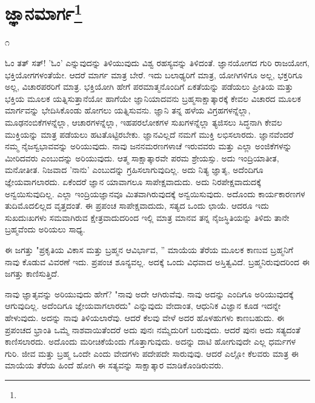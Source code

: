 
\chapter[ಜ್ಞಾನಮಾರ್ಗ]{ಜ್ಞಾನಮಾರ್ಗ\protect\footnote{}}

\begin{center}
೧
\end{center}

ಓಂ ತತ್ ಸತ್! 'ಓಂ' ಎನ್ನುವುದನ್ನು ತಿಳಿಯುವುದು ವಿಶ್ವ ರಹಸ್ಯವನ್ನು ತಿಳಿದಂತೆ. ಜ್ಞಾನಯೋಗದ ಗುರಿ ರಾಜಯೋಗ, ಭಕ್ತಿಯೋಗಗಳಂತೆಯೇ. ಆದರೆ ಮಾರ್ಗ ಮಾತ್ರ ಬೇರೆ. ಇದು ಬಲಾಢ್ಯರಿಗೆ ಮಾತ್ರ, ಯೋಗಿಗಳಿಗೂ ಅಲ್ಲ, ಭಕ್ತರಿಗೂ ಅಲ್ಲ, ವಿಚಾರಪರರಿಗೆ ಮಾತ್ರ. ಭಕ್ತಿಯೋಗಿ ಹೇಗೆ ಪರಮಾತ್ಮನೊಂದಿಗೆ ಏಕತೆಯನ್ನು ಪಡೆಯಲು ಪ್ರೀತಿಯ ಮತ್ತು ಭಕ್ತಿಯ ಮೂಲಕ ಯತ್ನಿಸುತ್ತಾನೆಯೋ ಹಾಗೆಯೇ ಜ್ಞಾನಿಯಾದವನು ಬ್ರಹ್ಮಸಾಕ್ಷಾತ್ಕಾರಕ್ಕೆ ಕೇವಲ ವಿಚಾರದ ಮೂಲಕ ಮಾರ್ಗವನ್ನು ಭೇದಿಸಿಕೊಂಡು ಹೋಗಲು ಯತ್ನಿಸುವನು. ಜ್ಞಾನಿ ತನ್ನ ಹಳೆಯ ವಿಗ್ರಹಗಳನ್ನೆಲ್ಲಾ, ಮೂಢನಂಬಿಕೆಗಳನ್ನೆಲ್ಲಾ, ಆಚಾರಗಳನ್ನೆಲ್ಲಾ, ಇಹಪರಲೋಕಗಳ ಸುಖಗಳನ್ನೆಲ್ಲಾ ತ್ಯಜಿಸಲು ಸಿದ್ಧನಾಗಿ ಕೇವಲ ಮುಕ್ತಿಯನ್ನು ಮಾತ್ರ ಪಡೆಯಲು ಹಟತೊಟ್ಟಿರಬೇಕು. ಜ್ಞಾನವಿಲ್ಲದೆ ನಮಗೆ ಮುಕ್ತಿ ಲಭಿಸಲಾರದು. ಜ್ಞಾನವೆಂದರೆ ನಮ್ಮ ನೈಜಸ್ವಭಾವವನ್ನು ಅರಿಯುವುದು. ನಾವು ಜನನಮರಣಗಳಾಚೆ ಇರುವವರು ಮತ್ತು ಎಲ್ಲಾ ಅಂಜಿಕೆಗಳನ್ನು ಮೀರಿದವರು ಎಂಬುದನ್ನು ಅರಿಯುವುದು. ಆತ್ಮ ಸಾಕ್ಷಾತ್ಕಾರವೇ ಪರಮ ಶ್ರೇಯಸ್ಸು. ಅದು ಇಂದ್ರಿಯಾತೀತ, ಮನೋತೀತ. ನಿಜವಾದ 'ನಾನು' ಎಂಬುದನ್ನು ಗ್ರಹಿಸಲಾಗುವುದಿಲ್ಲ. ಅದು ನಿತ್ಯ ಜ್ಞಾತೃ, ಅದೆಂದಿಗೂ ಜ್ಞೇಯವಾಗಲಾರದು. ಏಕೆಂದರೆ ಜ್ಞಾನ ಯಾವಾಗಲೂ ಸಾಪೇಕ್ಷವಾದುದು. ಅದು ನಿರಪೇಕ್ಷವಾದುದಕ್ಕೆ ಅನ್ವಯಿಸುವುದಿಲ್ಲ. ಎಲ್ಲಾ ಇಂದ್ರಿಯಜ್ಞಾನವೂ ಮಿತವಾಗಿರುವುದಕ್ಕೆ ಅನ್ವಯಿಸುವುದು. ಅದೊಂದು ಕಾರ್ಯಕಾರಣಗಳ ತುದಿಮೊದಲಿಲ್ಲದ ವೃತ್ತದಂತೆ. ಈ ಪ್ರಪಂಚ ಸಾಪೇಕ್ಷವಾದುದು, ಸತ್ಯದ ಒಂದು ಛಾಯೆ. ಆದರೂ ಇದು ಸುಖದುಃಖಗಳು ಸಮವಾಗಿರುವ ಕ್ಷೇತ್ರವಾದುದರಿಂದ ಇಲ್ಲಿ ಮಾತ್ರ ಮಾನವ ತನ್ನ ನೈಜಸ್ಥಿತಿಯನ್ನು ತಿಳಿದು ತಾನೇ ಬ್ರಹ್ಮವೆಂದು ಅರಿಯಲು ಸಾಧ್ಯ.

ಈ ಜಗತ್ತು "ಪ್ರಕೃತಿಯ ವಿಕಾಸ ಮತ್ತು ಬ್ರಹ್ಮನ ಆವಿರ್ಭಾವ, '' ಮಾಯೆಯ ತೆರೆಯ ಮೂಲಕ ಕಾಣುವ ಬ್ರಹ್ಮನಿಗೆ ನಾವು ಕೊಡುವ ವಿವರಣೆ ಇದು. ಪ್ರಪಂಚ ಶೂನ್ಯವಲ್ಲ. ಅದಕ್ಕೆ ಒಂದು ವಿಧವಾದ ಅಸ್ತಿತ್ವವಿದೆ. ಬ್ರಹ್ಮನಿರುವುದರಿಂದ ಈ ಜಗತ್ತು ಕಾಣಿಸುತ್ತಿದೆ.

ನಾವು ಜ್ಞಾತೃವನ್ನು ಅರಿಯುವುದು ಹೇಗೆ? "ನಾವು ಅದೇ ಆಗಿರುವೆವು. ನಾವು ಅದನ್ನು ಎಂದಿಗೂ ಅರಿಯುವುದಕ್ಕೆ ಆಗುವುದಿಲ್ಲ. ಅದೆಂದಿಗೂ ಜ್ಞೇಯವಾಗಲಾರದು" ಎನ್ನುವುದು ವೇದಾಂತ, ಆಧುನಿಕ ವಿಜ್ಞಾನ ಕೂಡ ಇದನ್ನೇ ಹೇಳುವುದು. ಅದನ್ನು ನಾವು ತಿಳಿಯಲಾರೆವು. ಆದರೆ ಕೆಲವು ವೇಳೆ ಅದರ ಹೊಳಹುಗಳು ಕಾಣಬಹುದು. ಈ ಪ್ರಪಂಚದ ಭ್ರಾಂತಿ ಒಮ್ಮೆ ನಾಶವಾಯಿತೆಂದರೆ ಅದು ಪುನಃ ನಮ್ಮೆದುರಿಗೆ ಬರುವುದು. ಆದರೆ ಪುನಃ ಅದು ಸತ್ಯದಂತೆ ಕಾಣಿಸಲಾರದು. ಅದೊಂದು ಮರೀಚಿಕೆಯೆಂದು ಗೊತ್ತಾಗುವುದು. ಅದನ್ನು ದಾಟಿ ಹೋಗುವುದೇ ಎಲ್ಲ ಧರ್ಮಗಳ ಗುರಿ. ಜೀವ ಮತ್ತು ಬ್ರಹ್ಮ ಒಂದೇ ಎಂದು ವೇದಗಳು ಪದೇಪದೇ ಸಾರುವುವು. ಆದರೆ ಎಲ್ಲೋ ಕೆಲವರು ಮಾತ್ರ ಈ ಮಾಯೆಯ ತೆರೆಯ ಹಿಂದೆ ಹೋಗಿ ಈ ಸತ್ಯವನ್ನು ಸಾಕ್ಷಾತ್ಕಾರ ಮಾಡಿಕೊಂಡಿರುವರು.

